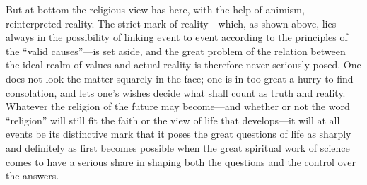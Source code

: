 \documentclass[12pt,a4paper]{article}
\newcommand{\opage}[1]{\marginnote{\footnotesize\textit{[#1]}}}
\begin{document}
But at bottom the religious view has here, with the help of animism, reinterpreted
reality. The strict mark of reality---which, as shown above, lies always in the
possibility of linking event to event according to the principles of the ``valid
causes''---is set aside, and the great problem of the relation between the ideal
realm of values and actual reality is therefore never seriously posed. One does not
look the matter squarely in the face; one is in too great a hurry to find
consolation, and lets one's wishes decide what shall count as truth and reality.
Whatever the religion of the future may become---and whether or not the word
``religion'' will still fit the faith or the view of life that develops---it will at
all \opage{33}events be its distinctive mark that it poses the great questions of life as
sharply and definitely as first becomes possible when the great spiritual work of
science comes to have a serious share in shaping both the questions and the control
over the answers.
\end{document}
